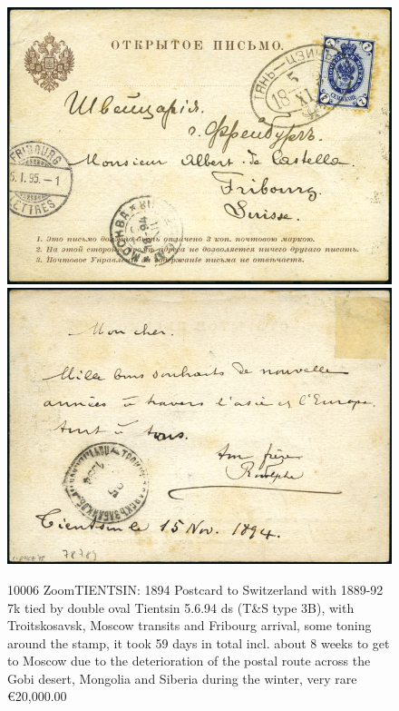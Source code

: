 \begin{figure}[htbp]
\centering
\includegraphics[width=.95\textwidth]{../russian-post-offices-in-china/10006.jpg}
\includegraphics[width=.95\textwidth]{../russian-post-offices-in-china/10006-1.jpg}
\caption{
10006		ZoomTIENTSIN: 1894 Postcard to Switzerland with 1889-92 7k tied 
by double oval Tientsin 5.6.94 ds (T\&S type 3B), with Troitskosavsk, 
Moscow transits and Fribourg arrival, some toning around the stamp, it took 59 days 
in total incl. about 8 weeks to get to Moscow due to the deterioration of 
the postal route across the Gobi desert, Mongolia and Siberia during the 
winter, very rare
\euro 20,000.00
}  
\end{figure}











                        